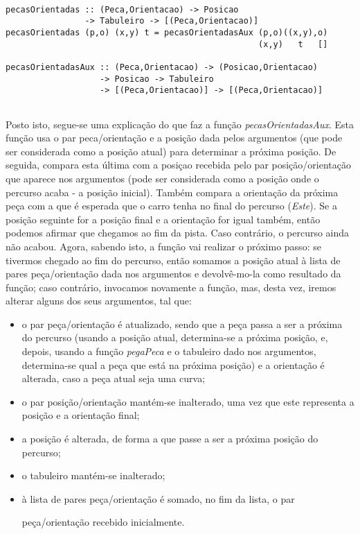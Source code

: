 \documentclass[a4paper]{report} %
\begin{document}
  \begin{verbatim}

pecasOrientadas :: (Peca,Orientacao) -> Posicao 
                -> Tabuleiro -> [(Peca,Orientacao)]
pecasOrientadas (p,o) (x,y) t = pecasOrientadasAux (p,o)((x,y),o) 
                                                   (x,y)   t   []

pecasOrientadasAux :: (Peca,Orientacao) -> (Posicao,Orientacao)
                   -> Posicao -> Tabuleiro
                   -> [(Peca,Orientacao)] -> [(Peca,Orientacao)]
                  
  \end{verbatim}
  
  \newpage

  \par \noindent Posto isto, segue-se uma explicação do que faz a função \textit{pecasOrientadasAux}. Esta função usa o par peca/orientação e a posição dada pelos argumentos (que pode ser considerada como a posição atual) para determinar a próxima posição. De seguida, compara esta última com a posiçao recebida pelo par posição/orientação que aparece nos argumentos (pode ser considerada como a posição onde o percurso acaba - a posição inicial). Também compara a orientação da próxima peça com a que é esperada que o carro tenha no final do percurso (\textit{Este}). Se a posição seguinte for a posição final e a orientação for igual também, então podemos afirmar que chegamos ao fim da pista. Caso contrário, o percurso ainda não acabou. Agora, sabendo isto, a função vai realizar o próximo passo: se tivermos chegado ao fim do percurso, então somamos a posição atual à lista de pares peça/orientação dada nos argumentos e devolvê-mo-la como resultado da função; caso contrário, invocamos novamente a função, mas, desta vez, iremos alterar alguns dos seus argumentos, tal que:

  \begin{itemize}
    
  \item o par peça/orientação é atualizado, sendo que a peça passa a ser a próxima do percurso (usando a posição atual, determina-se a próxima posição, e, depois, usando a função \textit{pegaPeca} e o tabuleiro dado nos argumentos, determina-se qual a peça que está na próxima posição) e a orientação é alterada, caso a peça atual seja uma curva;
  \item o par posição/orientação mantém-se inalterado, uma vez que este representa a posição e a orientação final;
  \item a posição é alterada, de forma a que passe a ser a próxima posição do percurso;
  \item o tabuleiro mantém-se inalterado;
  \item à lista de pares peça/orientação é somado, no fim da lista, o par 
  
  peça/orientação recebido inicialmente.
    
  \end{itemize}
\end{document}
